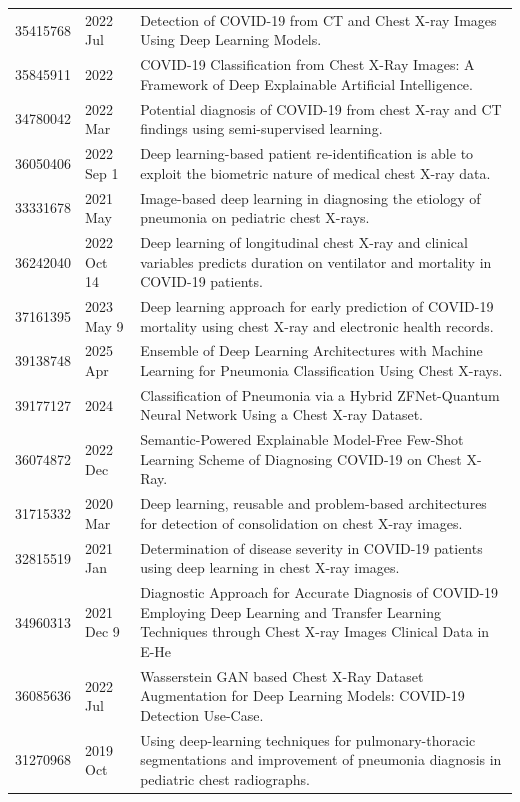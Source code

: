\begin{longtable}{llp{9.5cm}}
35415768 & 2022 Jul & Detection of COVID-19 from CT and Chest X-ray Images Using Deep Learning Models. \\
35845911 & 2022 & COVID-19 Classification from Chest X-Ray Images: A Framework of Deep Explainable Artificial Intelligence. \\
34780042 & 2022 Mar & Potential diagnosis of COVID-19 from chest X-ray and CT findings using semi-supervised learning. \\
36050406 & 2022 Sep 1 & Deep learning-based patient re-identification is able to exploit the biometric nature of medical chest X-ray data. \\
33331678 & 2021 May & Image-based deep learning in diagnosing the etiology of pneumonia on pediatric chest X-rays. \\
36242040 & 2022 Oct 14 & Deep learning of longitudinal chest X-ray and clinical variables predicts duration on ventilator and mortality in COVID-19 patients. \\
37161395 & 2023 May 9 & Deep learning approach for early prediction of COVID-19 mortality using chest X-ray and electronic health records. \\
39138748 & 2025 Apr & Ensemble of Deep Learning Architectures with Machine Learning for Pneumonia Classification Using Chest X-rays. \\
39177127 & 2024 & Classification of Pneumonia via a Hybrid ZFNet-Quantum Neural Network Using a Chest X-ray Dataset. \\
36074872 & 2022 Dec & Semantic-Powered Explainable Model-Free Few-Shot Learning Scheme of Diagnosing COVID-19 on Chest X-Ray. \\
31715332 & 2020 Mar & Deep learning, reusable and problem-based architectures for detection of consolidation on chest X-ray images. \\
32815519 & 2021 Jan & Determination of disease severity in COVID-19 patients using deep learning in chest X-ray images. \\
34960313 & 2021 Dec 9 & Diagnostic Approach for Accurate Diagnosis of COVID-19 Employing Deep Learning and Transfer Learning Techniques through Chest X-ray Images Clinical Data in E-He \\
36085636 & 2022 Jul & Wasserstein GAN based Chest X-Ray Dataset Augmentation for Deep Learning Models: COVID-19 Detection Use-Case. \\
31270968 & 2019 Oct & Using deep-learning techniques for pulmonary-thoracic segmentations and improvement of pneumonia diagnosis in pediatric chest radiographs. \\

\end{longtable}
